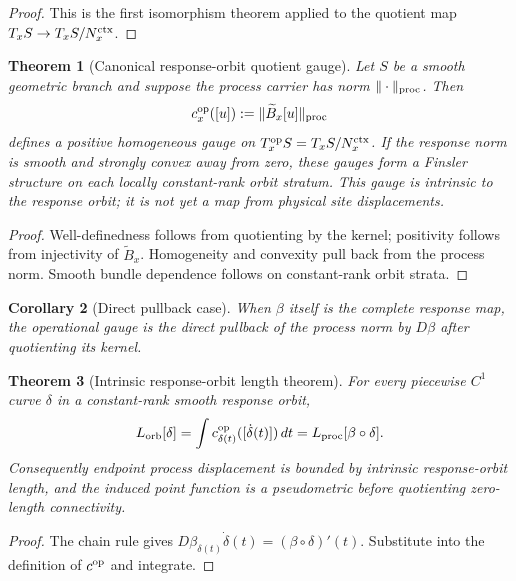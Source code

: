 \documentclass[11pt]{article}
\newtheorem{theorem}{Theorem}[section]
\newtheorem{corollary}[theorem]{Corollary}
\theoremstyle{remark}
\begin{document}
\begin{proof}
This is the first isomorphism theorem applied to the quotient map
$T_xS\to T_xS/N_x^{\rm ctx}$.
\end{proof}

\begin{theorem}[Canonical response-orbit quotient gauge]
\label{thm:canonical-operational-anchor}
Let $S$ be a smooth geometric branch and suppose the process carrier has norm
$\|\cdot\|_{\rm proc}$.  Then
\[
        c_x^{\rm op}([u])
        :=\|\widetilde B_x[u]\|_{\rm proc}
\]
defines a positive homogeneous gauge on $T_x^{\rm op}S=T_xS/N_x^{\rm ctx}$.  If the response norm
is smooth and strongly convex away from zero, these gauges form a Finsler
structure on each locally constant-rank orbit stratum.  This gauge is intrinsic
to the response orbit; it is not yet a map from physical site displacements.
\end{theorem}

\begin{proof}
Well-definedness follows from quotienting by the kernel; positivity follows
from injectivity of $\widetilde B_x$.  Homogeneity and convexity pull back from
the process norm.  Smooth bundle dependence follows on constant-rank orbit
strata.
\end{proof}

\begin{corollary}[Direct pullback case]
\label{cor:direct-pullback-anchor}
When $\beta$ itself is the complete response map, the operational gauge is the
direct pullback of the process norm by $D\beta$ after quotienting its kernel.
\end{corollary}

\begin{theorem}[Intrinsic response-orbit length theorem]
\label{thm:response-orbit-length}
For every piecewise $C^1$ curve $\delta$ in a constant-rank smooth response
orbit,
\[
 L_{\rm orb}[\delta]
 =\int c^{\rm op}_{\delta(t)}([\dot\delta(t)])\,dt
 =L_{\rm proc}[\beta\circ\delta].
\]
Consequently endpoint process displacement is bounded by intrinsic
response-orbit length, and the induced point function is a pseudometric before
quotienting zero-length connectivity.
\end{theorem}
\begin{proof}
The chain rule gives
$D\beta_{\delta(t)}\dot\delta(t)=(\beta\circ\delta)'(t)$.  Substitute into the
definition of $c^{\rm op}$ and integrate.
\end{proof}
\end{document}
